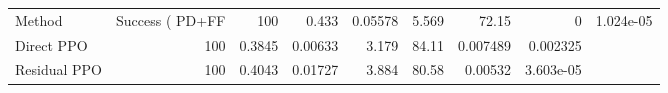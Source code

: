 \begin{tabular}{lrrrrrrr}
\toprule
Method & Success (%
\midrule
PD+FF & 100 & 0.433 & 0.05578 & 5.569 & 72.15 & 0 & 1.024e-05 \\
Direct PPO & 100 & 0.3845 & 0.00633 & 3.179 & 84.11 & 0.007489 & 0.002325 \\
Residual PPO & 100 & 0.4043 & 0.01727 & 3.884 & 80.58 & 0.00532 & 3.603e-05 \\
\bottomrule
\end{tabular}

